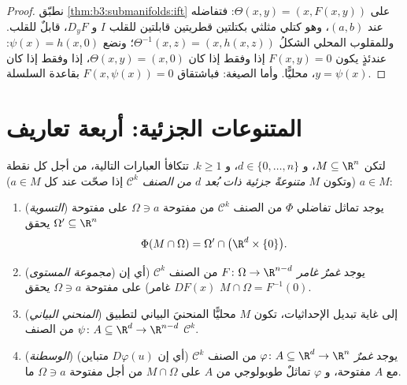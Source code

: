 \begin{proof}
نطبّق \cref{thm:b3:submanifolds:ift} على $\Theta(x, y) = (x,
F(x,y))$: فتفاضله عند $(a,b)$، وهو كتلي
مثلثي بكتلتين قطريتين قابلتين للقلب $I$ و $D_yF$، قابلٌ للقلب.
وللمقلوب المحلي الشكلُ $\Theta^{-1}(x, z) = (x, h(x,
z))$؛ ونضع $\psi(x) = h(x, 0)$: عندئذٍ يكون
$F(x, y) = 0$ إذا وفقط إذا كان $\Theta(x,y) = (x, 0)$، إذا وفقط إذا كان
$y = \psi(x)$، محليًّا. وأما الصيغة: فباشتقاق $F(x, \psi(x)) = 0$ بقاعدة
السلسلة.
\end{proof}

\section{المتنوعات الجزئية: أربعة تعاريف}

\begin{theorem}
\label{thm:b3:submanifolds:characterizations}
لتكن $M \subseteq \R^n$، و $d \in \{0, \dots, n\}$، و $k \geq
1$. تتكافأ العبارات التالية، من
أجل كل نقطة $a \in M$ (وتكون $M$ \emph{متنوعةً جزئية ذات بُعد
$d$ من الصنف $\mathcal C^k$} إذا صحّت عند
كل $a
\in M$):
\begin{enumerate}
  \item (\emph{التسوية}) يوجد تماثل تفاضلي $\Phi$ من الصنف
        $\mathcal C^k$ من مفتوحة $\Omega \ni a$ على مفتوحة
        $\Omega' \subseteq \R^n$ يحقق
        \[
        \Phi(M\cap\Omega) = \Omega' \cap
        \bigl(\R^d\times\{0\}\bigr).
        \]
  \item (\emph{مجموعة المستوى}) يوجد \emph{غمرٌ غامر}
        $F \colon \Omega \to \R^{n-d}$ من الصنف $\mathcal C^k$ (أي إن $DF(x)$ غامر)
        على مفتوحة $\Omega \ni a$ يحقق $M\cap\Omega = F^{-1}(0)$.
  \item (\emph{المنحني البياني}) إلى غاية تبديل الإحداثيات،
        تكون $M$ محليًّا المنحنيَ البياني لتطبيق $\psi
        \colon A \subseteq \R^d \to \R^{n-d}$ من
        الصنف $\mathcal C^k$.
  \item (\emph{الوسطنة}) يوجد \emph{غمرٌ} $\varphi \colon A \subseteq \R^d \to
        \R^n$ من الصنف
        $\mathcal C^k$ (أي إن $D\varphi(u)$ متباين) مع $A$
        مفتوحة، و $\varphi$ تماثلٌ طوبولوجي من $A$ على $M \cap
        \Omega$
        من أجل مفتوحة $\Omega \ni a$ ما.
\end{enumerate}
\end{theorem}

